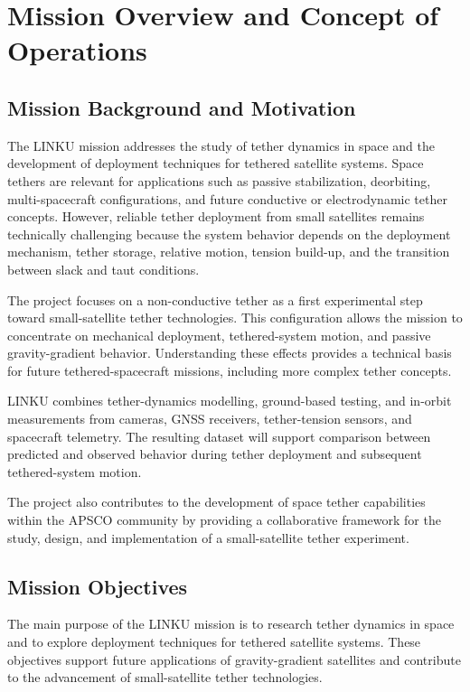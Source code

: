 \chapter{Mission Overview and Concept of Operations}
\label{ch:mission_overview_conops}

\section{Mission Background and Motivation}
\label{sec:mission_background_motivation}

The LINKU mission addresses the study of tether dynamics in space and the development of deployment techniques for tethered satellite systems. Space tethers are relevant for applications such as passive stabilization, deorbiting, multi-spacecraft configurations, and future conductive or electrodynamic tether concepts. However, reliable tether deployment from small satellites remains technically challenging because the system behavior depends on the deployment mechanism, tether storage, relative motion, tension build-up, and the transition between slack and taut conditions.

The project focuses on a non-conductive tether as a first experimental step toward small-satellite tether technologies. This configuration allows the mission to concentrate on mechanical deployment, tethered-system motion, and passive gravity-gradient behavior. Understanding these effects provides a technical basis for future tethered-spacecraft missions, including more complex tether concepts.

LINKU combines tether-dynamics modelling, ground-based testing, and in-orbit measurements from cameras, GNSS receivers, tether-tension sensors, and spacecraft telemetry. The resulting dataset will support comparison between predicted and observed behavior during tether deployment and subsequent tethered-system motion.

The project also contributes to the development of space tether capabilities within the APSCO community by providing a collaborative framework for the study, design, and implementation of a small-satellite tether experiment.

\section{Mission Objectives}
\label{sec:mission_objectives}

The main purpose of the LINKU mission is to research tether dynamics in space and to explore deployment techniques for tethered satellite systems. These objectives support future applications of gravity-gradient satellites and contribute to the advancement of small-satellite tether technologies.

